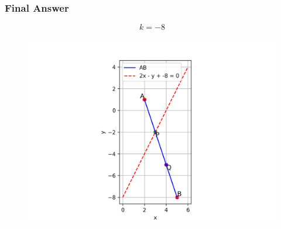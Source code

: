 \documentclass{beamer}
\begin{document}
\begin{frame}
    \frametitle{Final Answer}
    \[
    \boxed{k = -8}
    \]
\begin{figure}[h!]
    \centering
    \includegraphics[width=0.65\linewidth]{figs/fig.png}
    \caption{}
\end{figure}

\end{frame}
\end{document}

